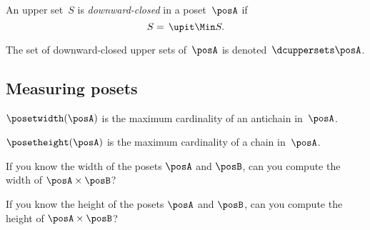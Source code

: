 \begin{definition}
  \label{def:downward-closed-upperset}
  An upper set~$S$ is \emph{downward-closed} in a poset~$\posA$ if
  \begin{equation}
    S =\, \upit  \Min S.
  \end{equation}
\end{definition}

The set of downward-closed upper sets of~$\posA$ is denoted~$\dcuppersets \posA$.

\subsection{Measuring posets}
\begin{definition}
  \label{def:poset-width}
  $\posetwidth(\posA)$ is the maximum cardinality of an antichain in~$\posA$.
\end{definition}


\begin{definition}
  \label{def:poset-height} $\posetheight(\posA)$ is the maximum cardinality of a chain in~$\posA$.
\end{definition}

\begin{exercise}\label{ex:width}
  If you know the width of the posets $\posA$ and $\posB$, can you compute the width of $\posA\times\posB$?
\end{exercise}
\begin{solution}
\end{solution}

\begin{exercise}\label{ex:height}
  If you know the height of the posets $\posA$ and $\posB$, can you compute the height of $\posA\times\posB$?
\end{exercise}
\begin{solution}
\end{solution}

